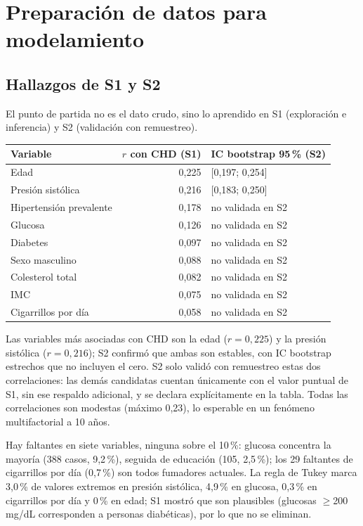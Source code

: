\documentclass[11pt,a4paper]{article}
\begin{document}
\vspace{0.5em}
\tableofcontents
\newpage

\section{Preparación de datos para modelamiento}
\subsection{Hallazgos de S1 y S2}
El punto de partida no es el dato crudo, sino lo aprendido en S1 (exploración e inferencia) y S2 (validación con remuestreo).

\begin{center}
\small
\begin{tabular}{@{}lrl@{}}
\toprule
\textbf{Variable} & \textbf{$r$ con CHD (S1)} & \textbf{IC bootstrap 95\,\% (S2)} \\
\midrule
Edad                     & 0,225 & [0,197; 0,254] \\
Presión sistólica        & 0,216 & [0,183; 0,250] \\
Hipertensión prevalente  & 0,178 & no validada en S2 \\
Glucosa                  & 0,126 & no validada en S2 \\
Diabetes                 & 0,097 & no validada en S2 \\
Sexo masculino           & 0,088 & no validada en S2 \\
Colesterol total         & 0,082 & no validada en S2 \\
IMC                      & 0,075 & no validada en S2 \\
Cigarrillos por día      & 0,058 & no validada en S2 \\
\bottomrule
\end{tabular}
\end{center}

Las variables más asociadas con CHD son la edad ($r=0,225$) y la presión sistólica ($r=0,216$); S2 confirmó que ambas son estables, con IC bootstrap estrechos que no incluyen el cero. S2 solo validó con remuestreo estas dos correlaciones: las demás candidatas cuentan únicamente con el valor puntual de S1, sin ese respaldo adicional, y se declara explícitamente en la tabla. Todas las correlaciones son modestas (máximo 0,23), lo esperable en un fenómeno multifactorial a 10 años.

Hay faltantes en siete variables, ninguna sobre el 10\,\%: glucosa concentra la mayoría (388 casos, 9,2\,\%), seguida de educación (105, 2,5\,\%); los 29 faltantes de cigarrillos por día (0,7\,\%) son todos fumadores actuales. La regla de Tukey marca 3,0\,\% de valores extremos en presión sistólica, 4,9\,\% en glucosa, 0,3\,\% en cigarrillos por día y 0\,\% en edad; S1 mostró que son plausibles (glucosas $\geq$200\,mg/dL corresponden a personas diabéticas), por lo que no se eliminan.
\end{document}
